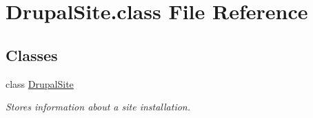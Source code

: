 \hypertarget{DrupalSite_8class}{\section{Drupal\-Site.\-class File Reference}
\label{DrupalSite_8class}
}
\subsection*{Classes}
\begin{DoxyCompactItemize}
\item 
class \hyperlink{classDrupalSite}{Drupal\-Site}
\begin{DoxyCompactList}\small\item\em Stores information about a site installation. \end{DoxyCompactList}\end{DoxyCompactItemize}

